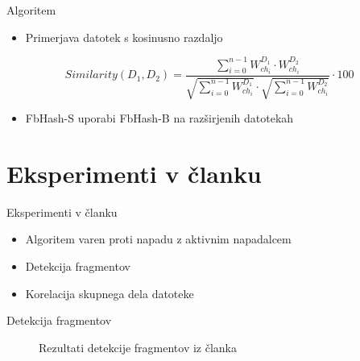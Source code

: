 \documentclass[xcolor=dvipsnames,compress]{beamer}
\begin{document}
\begin{frame}{Algoritem}
    \begin{itemize}
    \item Primerjava datotek s kosinusno razdaljo
    \end{itemize}
   \[Similarity(D_1, D_2)=\frac{\sum_{i=0}^{n-1} W_{ch_i}^{D_1} \cdot W_{ch_i}^{D_2}}{\sqrt{\sum_{i=0}^{n-1} W_{ch_i}^{D_1}}\cdot\sqrt{\sum_{i=0}^{n-1} W_{ch_i}^{D_2}}}\cdot 100\]
   \begin{itemize}
    \item FbHash-S uporabi FbHash-B na razširjenih datotekah
    \end{itemize}
\end{frame}

\section{Eksperimenti v članku}
\label{sec:eksoni}

\begin{frame}{Eksperimenti v članku}
    \begin{itemize}
    \item Algoritem varen proti napadu z aktivnim napadalcem
    \item Detekcija fragmentov
    \item Korelacija skupnega dela datoteke
    \end{itemize}
\end{frame}

\begin{frame}{Detekcija fragmentov}
   \begin{figure}[ht!]
        \label{fig:subfigures}
        \begin{center}
        \end{center}
       \caption{Rezultati detekcije fragmentov iz članka}
    \end{figure}
\end{frame}
\end{document}
